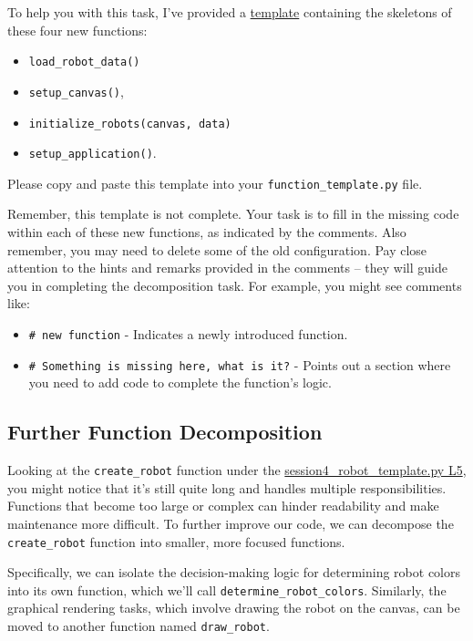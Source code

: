 To help you with this task, I've provided a 
\href{https://github.com/balandongiv/computer_programming_gist/blob/main/session4/additional_function.py}{template} 
containing the skeletons of these four new functions: 
\begin{itemize}
    \item \texttt{load\_robot\_data()}
    \item \texttt{setup\_canvas()}, 
    \item \texttt{initialize\_robots(canvas, data)}
    \item \texttt{setup\_application()}.
\end{itemize}


Please copy and paste this template into your \texttt{function\_template.py} file.


Remember, this template is not complete. Your task is to fill in the missing code within each of these new functions, as indicated by the comments. Also remember, you may need to delete some of the old configuration. Pay close attention to the hints and remarks provided in the comments – they will guide you in completing the decomposition task. For example, you might see comments like:

\begin{itemize}
\item \texttt{\# new function} - Indicates a newly introduced function.
\item \texttt{\# Something is missing here, what is it?} - Points out a section where you need to add code to complete the function's logic.
\end{itemize}

\newpage
\subsection{Further Function Decomposition}
Looking at the \texttt{create\_robot} function under the \href{https://github.com/balandongiv/computer_programming_gist/blob/main/session4/session4_robot_template.py}{session4\_robot\_template.py L5}, you might notice that it's still quite long and handles multiple responsibilities. Functions that become too large or complex can hinder readability and make maintenance more difficult. To further improve our code, we can decompose the \texttt{create\_robot} function into smaller, more focused functions.

Specifically, we can isolate the decision-making logic for determining robot colors into its own function, which we'll call \texttt{determine\_robot\_colors}. Similarly, the graphical rendering tasks, which involve drawing the robot on the canvas, can be moved to another function named \texttt{draw\_robot}.


